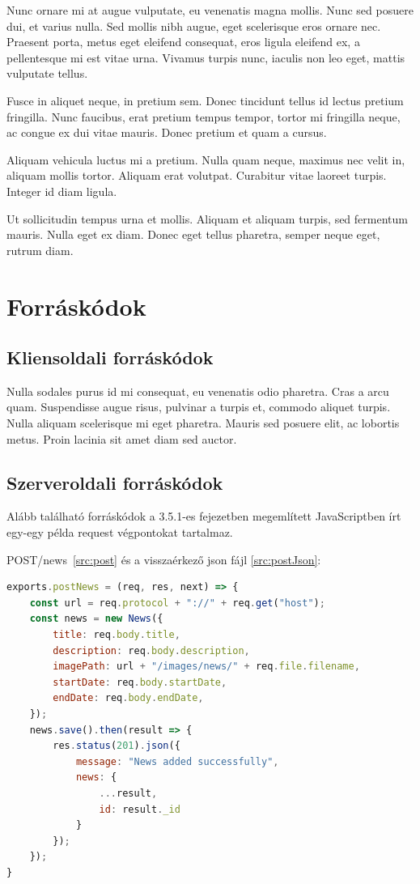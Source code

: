 \begin{remark}
Nunc ornare mi at augue vulputate, eu venenatis magna mollis. Nunc sed posuere dui, et varius nulla. Sed mollis nibh augue, eget scelerisque eros ornare nec. Praesent porta, metus eget eleifend consequat, eros ligula eleifend ex, a pellentesque mi est vitae urna. Vivamus turpis nunc, iaculis non leo eget, mattis vulputate tellus.
\end{remark}

Fusce in aliquet neque, in pretium sem. Donec tincidunt tellus id lectus pretium fringilla. Nunc faucibus, erat pretium tempus tempor, tortor mi fringilla neque, ac congue ex dui vitae mauris. Donec pretium et quam a cursus.

\begin{note}
Aliquam vehicula luctus mi a pretium. Nulla quam neque, maximus nec velit in, aliquam mollis tortor. Aliquam erat volutpat. Curabitur vitae laoreet turpis. Integer id diam ligula.
\end{note}

Ut sollicitudin tempus urna et mollis. Aliquam et aliquam turpis, sed fermentum mauris. Nulla eget ex diam. Donec eget tellus pharetra, semper neque eget, rutrum diam.


\section{Forráskódok} %

\subsection{Kliensoldali forráskódok}
Nulla sodales purus id mi consequat, eu venenatis odio pharetra. Cras a arcu quam. Suspendisse augue risus, pulvinar a turpis et, commodo aliquet turpis. Nulla aliquam scelerisque mi eget pharetra. Mauris sed posuere elit, ac lobortis metus. Proin lacinia sit amet diam sed auctor.

\subsection{Szerveroldali forráskódok}
Alább található forráskódok a 3.5.1-es fejezetben megemlített JavaScriptben írt egy-egy példa request végpontokat tartalmaz.

POST/news~\ref{src:post} és a visszaérkező json fájl \ref{src:postJson}:

\begin{lstlisting}[language=JavaScript]
exports.postNews = (req, res, next) => {
	const url = req.protocol + "://" + req.get("host");
	const news = new News({
		title: req.body.title,
		description: req.body.description,
		imagePath: url + "/images/news/" + req.file.filename,
		startDate: req.body.startDate,
		endDate: req.body.endDate,
	});
	news.save().then(result => {
		res.status(201).json({
			message: "News added successfully",
			news: {
				...result,
				id: result._id
			}
		});
	});
}
\end{lstlisting}

